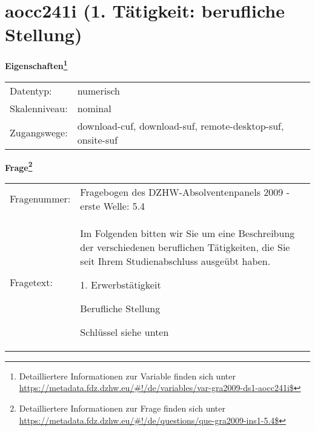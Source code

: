 
    \setcounter{footnote}{0}

    \vspace*{-1.8cm}
	\section{aocc241i (1. Tätigkeit: berufliche Stellung)}
	\label{section:aocc241i}



    \vspace*{0.5cm}
    \noindent\textbf{Eigenschaften\footnote{Detailliertere Informationen zur Variable finden sich unter
		\url{https://metadata.fdz.dzhw.eu/\#!/de/variables/var-gra2009-ds1-aocc241i$}}}\\
	\begin{tabularx}{\hsize}{@{}lX}
	Datentyp: & numerisch \\
	Skalenniveau: & nominal \\
	Zugangswege: &
	  download-cuf, 
	  download-suf, 
	  remote-desktop-suf, 
	  onsite-suf
 \\
    \end{tabularx}



				\vspace*{0.5cm}
                \noindent\textbf{Frage\footnote{Detailliertere Informationen zur Frage finden sich unter
		              \url{https://metadata.fdz.dzhw.eu/\#!/de/questions/que-gra2009-ins1-5.4$}}}\\
				\begin{tabularx}{\hsize}{@{}lX}
					Fragenummer: &
					  Fragebogen des DZHW-Absolventenpanels 2009 - erste Welle:
					  5.4
 \\
					Fragetext: & Im Folgenden bitten wir Sie um eine Beschreibung der verschiedenen beruflichen Tätigkeiten, die Sie seit Ihrem Studienabschluss ausgeübt haben.\par  1. Erwerbstätigkeit\par  Berufliche Stellung\par  Schlüssel siehe unten \\
				\end{tabularx}





